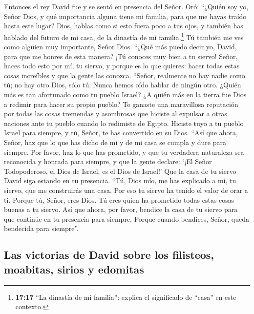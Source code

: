  Entonces el rey David fue y se sentó en presencia del
Señor. Oró: ``¿Quién soy yo, Señor Dios, y qué importancia alguna tiene
mi familia, para que me hayas traído hasta este lugar? 
Dios, hablas como si esto fuera poco a tus ojos, y también has hablado
del futuro de mi casa, de la dinastía de mi familia.\footnote{\textbf{17:17}
  ``La dinastía de mi familia'': explica el significado de ``casa'' en
  este contexto.} Tú también me ves como alguien muy importante, Señor
Dios.  ``¿Qué más puedo decir yo, David, para que me
honres de esta manera? ¡Tú conoces muy bien a tu siervo! 
Señor, haces todo esto por mí, tu siervo, y porque es lo que quieres:
hacer todas estas cosas increíbles y que la gente las conozca.
 ``Señor, realmente no hay nadie como tú; no hay otro
Dios, sólo tú. Nunca hemos oído hablar de ningún otro. 
¿Quién más es tan afortunado como tu pueblo Israel? ¿A quién más en la
tierra fue Dios a redimir para hacer su propio pueblo? Te ganaste una
maravillosa reputación por todas las cosas tremendas y asombrosas que
hiciste al expulsar a otras naciones ante tu pueblo cuando lo redimiste
de Egipto.  Hiciste tuyo a tu pueblo Israel para siempre,
y tú, Señor, te has convertido en su Dios.  ``Así que
ahora, Señor, haz que lo que has dicho de mí y de mi casa se cumpla y
dure para siempre. Por favor, haz lo que has prometido, 
y que tu verdadera naturaleza sea reconocida y honrada para siempre, y
que la gente declare: `¡El Señor Todopoderoso, el Dios de Israel, es el
Dios de Israel!' Que la casa de tu siervo David siga estando en tu
presencia.  ``Tú, Dios mío, me has explicado a mí, tu
siervo, que me construirás una casa. Por eso tu siervo ha tenido el
valor de orar a ti.  Porque tú, Señor, eres Dios. Tú eres
quien ha prometido todas estas cosas buenas a tu siervo. 
Así que ahora, por favor, bendice la casa de tu siervo para que continúe
en tu presencia para siempre. Porque cuando bendices, Señor, queda
bendecida para siempre''.

\hypertarget{las-victorias-de-david-sobre-los-filisteos-moabitas-sirios-y-edomitas}{%
\subsection{Las victorias de David sobre los filisteos, moabitas, sirios
y
edomitas}\label{las-victorias-de-david-sobre-los-filisteos-moabitas-sirios-y-edomitas}}

